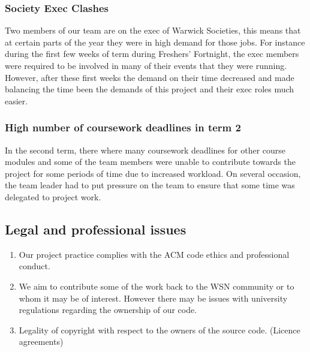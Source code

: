 \subsubsection{Society Exec Clashes}
Two members of our team are on the exec of Warwick Societies, this means that at certain parts of the year they were in high demand for those jobs. For instance during the first few weeks of term during Freshers' Fortnight, the exec members were required to be involved in many of their events that they were running. However, after these first weeks the demand on their time decreased and made balancing the time been the demands of this project and their exec roles much easier.

\subsubsection{High number of coursework deadlines in term 2}
In the second term, there where many coursework deadlines for other course modules and some of the team members were unable to contribute towards the project for some periods of time due to increased workload. On several occasion, the team leader had to put pressure on the team to ensure that some time was delegated to project work. 

\subsection{Legal and professional issues}

\begin{enumerate}
	\item Our project practice complies with the ACM code ethics and professional conduct.
	\item We aim to contribute some of the work back to the WSN community or to whom it may be of interest. However there may be issues with university regulations regarding the ownership of our code.
	\item Legality of copyright with respect to the owners of the source code. (Licence agreements)
\end{enumerate}

